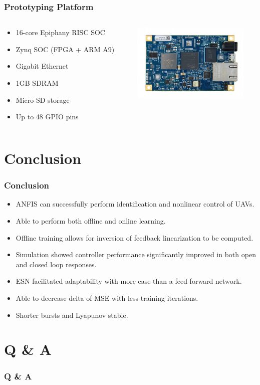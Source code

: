 \documentclass{beamer}
\begin{document}
   \begin{frame}
      \frametitle{Prototyping Platform}
      \begin{columns}[T]
         \begin{column}[T]{5cm}
            \begin{itemize}
               \item 16-core Epiphany RISC SOC
               \item Zynq SOC (FPGA + ARM A9)
               \item Gigabit Ethernet
               \item 1GB SDRAM
               \item Micro-SD storage
               \item Up to 48 GPIO pins
            \end{itemize}
         \end{column}
         \begin{column}[T]{5cm}
            \includegraphics[height=3.7cm]{parallela}
         \end{column}
      \end{columns} 
   \end{frame}

   \section{Conclusion}
 
   \begin{frame}
      \frametitle{Conclusion}
      \begin{itemize}
         \item ANFIS can successfully perform identification and nonlinear control of UAVs.
         \item Able to perform both offline and online learning.
         \item Offline training allows for inversion of feedback linearization to be computed.
         \item Simulation showed controller performance significantly improved in both open and closed loop responses.
         \item ESN facilitated adaptability with more ease than a feed forward network.
         \item Able to decrease delta of MSE with less training iterations.
         \item Shorter bursts and Lyapunov stable.
      \end{itemize}
   \end{frame}

   \section{Q \& A}

   \begin{frame}
      \frametitle{Q \& A}
   \end{frame}
\end{document}

